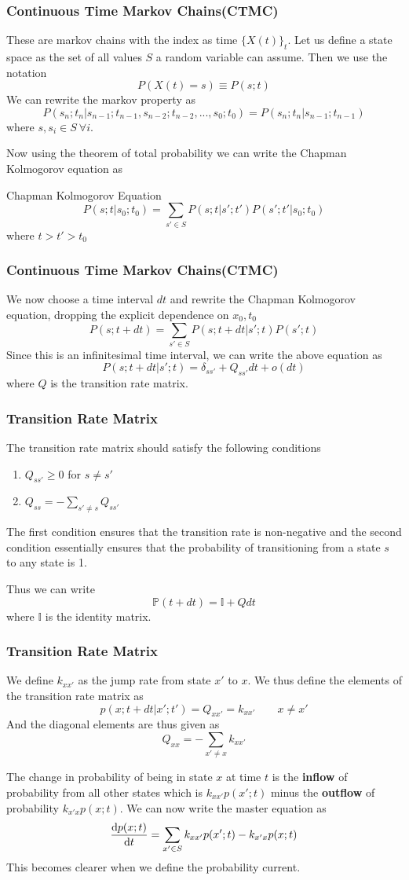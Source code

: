 \documentclass[9pt]{beamer}
\begin{document}
\begin{frame}
  \frametitle{Continuous Time Markov Chains(CTMC)}
  These are markov chains with the index as time $\{X(t)\}_t$. Let us define a state space as the 
  set of all values $S$ a random variable can assume. Then we use the notation 
  $$ P(X(t) = s) \equiv P(s;t)$$
  We can rewrite the markov property as 
  $$ P(s_n;t_n|s_{n-1};t_{n-1},s_{n-2};t_{n-2},...,s_0;t_0) = P(s_n;t_n|s_{n-1};t_{n-1})$$
  where $s,s_i \in S ~ \forall i$.

  Now using the theorem of total probability we can write the Chapman Kolmogorov equation as
  \begin{block}{Chapman Kolmogorov Equation}
  $$ P(s;t|s_0;t_0) = \sum_{s' \in S} P(s;t|s';t')P(s';t'|s_0;t_0)$$ where $t > t' > t_0$
  \end{block}
\end{frame}
\begin{frame}
  \frametitle{Continuous Time Markov Chains(CTMC)}
  We now choose a time interval $dt$ and rewrite the Chapman Kolmogorov equation, dropping the 
  explicit dependence on $x_0,t_0$
  $$ P(s;t+dt) = \sum_{s' \in S} P(s;t+dt|s';t)P(s';t)$$
  Since this is an infinitesimal time interval, we can write the above equation as
  $$ P(s;t+dt|s';t) = \delta_{ss'} +Q_{ss'}dt + o(dt)$$
  where $Q$ is the transition rate matrix. 
\end{frame}

\begin{frame}
  \frametitle{Transition Rate Matrix}
  The transition rate matrix should satisfy the following conditions 
  \begin{enumerate}
    \item $Q_{ss'} \geq 0$ for $s \neq s'$
    \item $Q_{ss} = -\sum_{s' \neq s} Q_{ss'}$
  \end{enumerate}
  The first condition ensures that the transition rate is non-negative and the second condition
  essentially ensures that the probability of transitioning from a state $s$ to any state is 1.
  
  Thus we can write 
  $$\mathbb{P}(t+dt) = \mathbb{I} + Qdt$$ where $\mathbb{I}$ is the identity matrix.

\end{frame}

\begin{frame}
  \frametitle{Transition Rate Matrix}
  We define $k_{xx'}$ as the jump rate from state $x'$ to $x$.
  We thus define the elements of the transition rate matrix as
  $$ p(x;t+dt|x';t' ) = Q_{xx'} = k_{xx'} \quad \quad x \neq x'$$
  And the diagonal elements are thus given as 
  $$Q_{xx} = -\sum_{x' \neq x} k_{xx'}$$

  The change in probability of being in state $x$ at time $t$ is the \textbf{inflow} of probability from all other states
  which is $ k_{xx'}p(x';t)$ minus the \textbf{outflow} of probability  $k_{x'x}p(x;t)$.
  We can now write the master equation as
  $$\dv{p(x;t)}{t} = \sum_{x' \in S} k_{xx'}p(x';t) - k_{x'x}p(x;t)$$
  This becomes clearer when we define the probability current.
\end{frame}
\end{document}
